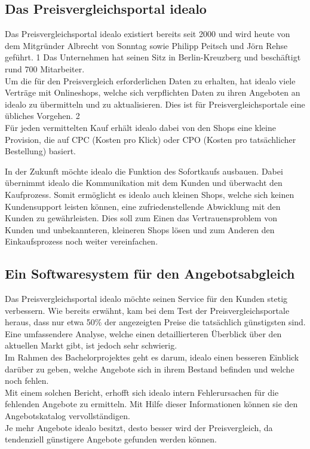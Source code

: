 \subsection{Das Preisvergleichsportal idealo}
\label{sec:einleitung-2}


Das Preisvergleichsportal idealo existiert bereits seit 2000 und wird heute von dem Mitgründer Albrecht von Sonntag
sowie Philipp Peitsch und Jörn Rehse geführt. 1
Das Unternehmen hat seinen Sitz in Berlin-Kreuzberg und beschäftigt rund 700 Mitarbeiter.\\
Um die für den Preisvergleich erforderlichen Daten zu erhalten, hat idealo viele Verträge mit Onlineshops, welche
sich verpflichten Daten zu ihren Angeboten an idealo zu übermitteln und zu aktualisieren.
Dies ist für Preisvergleichsportale eine übliches Vorgehen. 2\\
Für jeden vermittelten Kauf erhält idealo dabei von den Shops eine kleine Provision, die auf CPC (Kosten pro Klick)
oder CPO (Kosten pro tatsächlicher Bestellung) basiert.

In der Zukunft möchte idealo die Funktion des Sofortkaufs ausbauen.
Dabei übernimmt idealo die Kommunikation mit dem Kunden und überwacht den Kaufprozess.
Somit ermöglicht es idealo auch kleinen Shops, welche sich keinen Kundensupport leisten können, eine
zufriedenstellende Abwicklung mit den Kunden zu gewährleisten.
Dies soll zum Einen das Vertrauensproblem von Kunden und unbekannteren, kleineren Shops lösen und zum Anderen den
Einkaufsprozess noch weiter vereinfachen.

\subsection{Ein Softwaresystem für den Angebotsabgleich}

Das Preisvergleichsportal idealo möchte seinen Service für den Kunden stetig verbessern.
Wie bereits erwähnt, kam bei dem Test der Preisvergleichsportale heraus, dass nur etwa 50\% der angezeigten Preise
die tatsächlich günstigsten sind.
Eine umfassendere Analyse, welche einen detaillierteren Überblick über den aktuellen Markt gibt, ist jedoch sehr
schwierig. \\
Im Rahmen des Bachelorprojektes geht es darum, idealo einen besseren Einblick darüber zu geben, welche Angebote sich
in ihrem Bestand befinden und welche noch fehlen. \\
Mit einem solchen Bericht, erhofft sich idealo intern Fehlerursachen für die fehlenden Angebote zu ermitteln.
Mit Hilfe dieser Informationen können sie den Angebotskatalog vervollständigen. \\
Je mehr Angebote idealo besitzt, desto besser wird der Preisvergleich, da tendenziell günstigere Angebote gefunden
werden können.

